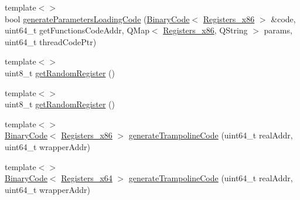 \begin{DoxyCompactItemize}
\item 
{\footnotesize template$<$$>$ }\\bool \hyperlink{class_p_e_adding_methods_abd485937ce84b0a42427feed0517a023}{generate\-Parameters\-Loading\-Code} (\hyperlink{class_binary_code}{Binary\-Code}$<$ \hyperlink{codedefines_8h_a0f84efe4ca4d99203713a78bd6e8c82e}{Registers\-\_\-x86} $>$ \&code, uint64\-\_\-t get\-Functions\-Code\-Addr, Q\-Map$<$ \hyperlink{codedefines_8h_a0f84efe4ca4d99203713a78bd6e8c82e}{Registers\-\_\-x86}, Q\-String $>$ params, uint64\-\_\-t thread\-Code\-Ptr)
\item 
{\footnotesize template$<$$>$ }\\uint8\-\_\-t \hyperlink{class_p_e_adding_methods_adeaea127e3092b4c7269e042a664bf51}{get\-Random\-Register} ()
\item 
{\footnotesize template$<$$>$ }\\uint8\-\_\-t \hyperlink{class_p_e_adding_methods_adeaea127e3092b4c7269e042a664bf51}{get\-Random\-Register} ()
\item 
{\footnotesize template$<$$>$ }\\\hyperlink{class_binary_code}{Binary\-Code}$<$ \hyperlink{codedefines_8h_a0f84efe4ca4d99203713a78bd6e8c82e}{Registers\-\_\-x86} $>$ \hyperlink{class_p_e_adding_methods_a1723723cc8e2d43b53e5aae0badf093e}{generate\-Trampoline\-Code} (uint64\-\_\-t real\-Addr, uint64\-\_\-t wrapper\-Addr)
\item 
{\footnotesize template$<$$>$ }\\\hyperlink{class_binary_code}{Binary\-Code}$<$ \hyperlink{codedefines_8h_a5e15b5c4d766f6faf29b5bcec37bde5c}{Registers\-\_\-x64} $>$ \hyperlink{class_p_e_adding_methods_a0a8d3c53ed444e2e90973758f3fc6038}{generate\-Trampoline\-Code} (uint64\-\_\-t real\-Addr, uint64\-\_\-t wrapper\-Addr)
\end{DoxyCompactItemize}
